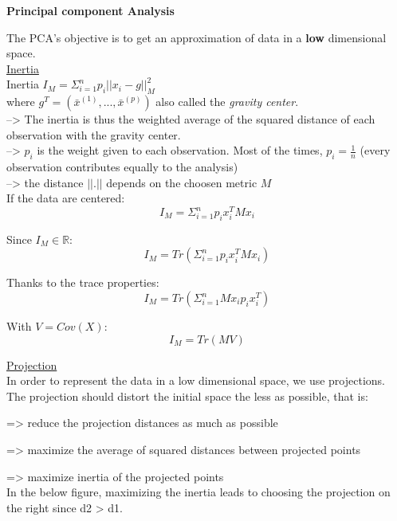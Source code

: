 {\fontsize{12pt}{22pt} \textbf{Principal component Analysis}\par}

\vspace{5mm}

The PCA's objective is to get an approximation of data in a \textbf{low} dimensional space. \\

\underline{Inertia} \\

Inertia $I_M = \Sigma_{i=1}^n p_i ||x_i - g||_M^2$ \\

where $g^T = (\bar{x}^{(1)},...,\bar{x}^{(p)})$ also called the \textit{gravity center}. \\

--> The inertia is thus the weighted average of the squared distance of each observation with the gravity center. \\

--> $p_i$ is the weight given to each observation. Most of the times, $p_i = \frac{1}{n}$ (every observation contributes equally to the analysis) \\

-->  the distance $||.||$ depends on the choosen metric $M$ \\

If the data are centered:
$$I_M = \Sigma_{i=1}^n p_i x_i^T M x_i$$

Since $I_M \in \mathbb{R}$:
$$I_M = Tr(\Sigma_{i=1}^n p_i x_i^T M x_i)$$

Thanks to the trace properties:
$$I_M = Tr(\Sigma_{i=1}^n M x_i p_i x_i^T)$$

With $V = Cov(X)$:
$$I_M = Tr(MV)$$

\underline{Projection} \\

In order to represent the data in a low dimensional space, we use projections. \\

The projection should distort the initial space the less as possible, that is:

=> reduce the projection distances as much as possible

=> maximize the average of squared distances between projected points

=> maximize inertia of the projected points \\

In the below figure, maximizing the inertia leads to choosing the projection on the right since d2 > d1.

